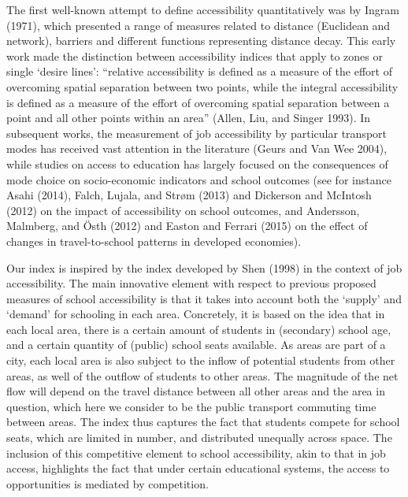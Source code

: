 \documentclass[]{article}
\begin{document}
The first well-known attempt to define accessibility quantitatively was
by Ingram (1971), which presented a range of measures related to
distance (Euclidean and network), barriers and different functions
representing distance decay. This early work made the distinction
between accessibility indices that apply to zones or single `desire
lines': ``relative accessibility is defined as a measure of the effort
of overcoming spatial separation between two points, while the integral
accessibility is defined as a measure of the effort of overcoming
spatial separation between a point and all other points within an area''
(Allen, Liu, and Singer 1993). In subsequent works, the measurement of
job accessibility by particular transport modes has received vast
attention in the literature (Geurs and Van Wee 2004), while studies on
access to education has largely focused on the consequences of mode
choice on socio-economic indicators and school outcomes (see for
instance Asahi (2014), Falch, Lujala, and Str{ø}m (2013) and Dickerson
and McIntosh (2012) on the impact of accessibility on school outcomes,
and Andersson, Malmberg, and {Ö}sth (2012) and Easton and Ferrari (2015)
on the effect of changes in travel-to-school patterns in developed
economies).

Our index is inspired by the index developed by Shen (1998) in the
context of job accessibility. The main innovative element with respect
to previous proposed measures of school accessibility is that it takes
into account both the `supply' and `demand' for schooling in each area.
Concretely, it is based on the idea that in each local area, there is a
certain amount of students in (secondary) school age, and a certain
quantity of (public) school seats available. As areas are part of a
city, each local area is also subject to the inflow of potential
students from other areas, as well of the outflow of students to other
areas. The magnitude of the net flow will depend on the travel distance
between all other areas and the area in question, which here we consider
to be the public transport commuting time between areas. The index thus
captures the fact that students compete for school seats, which are
limited in number, and distributed unequally across space. The inclusion
of this competitive element to school accessibility, akin to that in job
access, highlights the fact that under certain educational systems, the
access to opportunities is mediated by competition.
\end{document}
